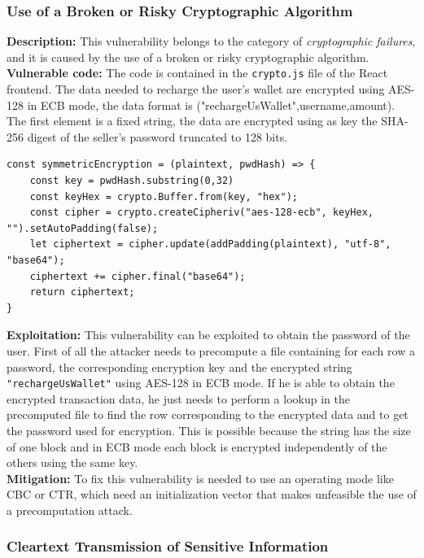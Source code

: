 \documentclass[]{article}
\begin{document}
\subsubsection{Use of a Broken or Risky Cryptographic Algorithm}
\label{subsubsec:use_of_a_broken_or_risky_cryptographic_algorithm}
\textbf{Description:} This vulnerability belongs to the category of {\it cryptographic failures}, and it is caused by the use of a broken or risky cryptographic algorithm. \\ 
\textbf{Vulnerable code:} The code is contained in the \texttt{crypto.js} file of the React frontend. The data needed to recharge the user's wallet are encrypted 
using AES-128 in ECB mode, the data format is ("rechargeUsWallet",username,amount). The first element is a fixed string, the data are encrypted using as key the 
SHA-256 digest of the seller's password truncated to 128 bits. 
\begin{lstlisting}
const symmetricEncryption = (plaintext, pwdHash) => {
	const key = pwdHash.substring(0,32)  
	const keyHex = crypto.Buffer.from(key, "hex");  
 	const cipher = crypto.createCipheriv("aes-128-ecb", keyHex, "").setAutoPadding(false);
  	let ciphertext = cipher.update(addPadding(plaintext), "utf-8", "base64");
  	ciphertext += cipher.final("base64");
  	return ciphertext;
}
\end{lstlisting}
\textbf{Exploitation:} This vulnerability can be exploited to obtain the password of the user. First of all the attacker needs 
to precompute a file containing for each row a password, the corresponding encryption key and the encrypted string \texttt{"rechargeUsWallet"} 
using AES-128 in ECB mode. If he is able to obtain the encrypted transaction data, he just needs to perform a lookup in the precomputed file 
to find the row corresponding to the encrypted data and to get the password used for encryption. This is possible because the string has the 
size of one block and in ECB mode each block is encrypted independently of the others using the same key. 
\\ 
\textbf{Mitigation:} To fix this vulnerability is needed to use an operating mode like CBC or CTR, which need an initialization vector that makes unfeasible 
the use of a precomputation attack.

\subsubsection{Cleartext Transmission of Sensitive Information}
\label{subsubsec:cleartext_transmission_of_sensitive_information}
\end{document}
